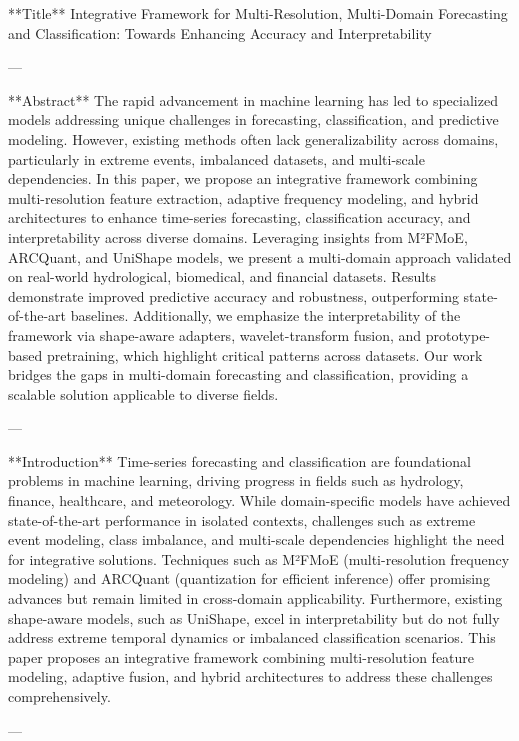 **Title**  
Integrative Framework for Multi-Resolution, Multi-Domain Forecasting and Classification: Towards Enhancing Accuracy and Interpretability  

---

**Abstract**  
The rapid advancement in machine learning has led to specialized models addressing unique challenges in forecasting, classification, and predictive modeling. However, existing methods often lack generalizability across domains, particularly in extreme events, imbalanced datasets, and multi-scale dependencies. In this paper, we propose an integrative framework combining multi-resolution feature extraction, adaptive frequency modeling, and hybrid architectures to enhance time-series forecasting, classification accuracy, and interpretability across diverse domains. Leveraging insights from M²FMoE, ARCQuant, and UniShape models, we present a multi-domain approach validated on real-world hydrological, biomedical, and financial datasets. Results demonstrate improved predictive accuracy and robustness, outperforming state-of-the-art baselines. Additionally, we emphasize the interpretability of the framework via shape-aware adapters, wavelet-transform fusion, and prototype-based pretraining, which highlight critical patterns across datasets. Our work bridges the gaps in multi-domain forecasting and classification, providing a scalable solution applicable to diverse fields.

---

**Introduction**  
Time-series forecasting and classification are foundational problems in machine learning, driving progress in fields such as hydrology, finance, healthcare, and meteorology. While domain-specific models have achieved state-of-the-art performance in isolated contexts, challenges such as extreme event modeling, class imbalance, and multi-scale dependencies highlight the need for integrative solutions. Techniques such as M²FMoE (multi-resolution frequency modeling) and ARCQuant (quantization for efficient inference) offer promising advances but remain limited in cross-domain applicability. Furthermore, existing shape-aware models, such as UniShape, excel in interpretability but do not fully address extreme temporal dynamics or imbalanced classification scenarios. This paper proposes an integrative framework combining multi-resolution feature modeling, adaptive fusion, and hybrid architectures to address these challenges comprehensively.  

---

